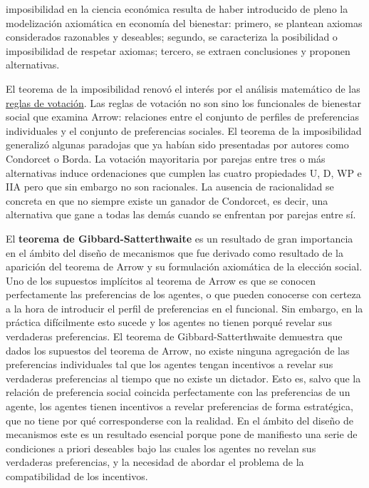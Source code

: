 \documentclass{nuevotema}
\begin{document}
imposibilidad en la ciencia económica resulta de haber introducido de pleno la modelización axiomática en economía del bienestar: primero, se plantean axiomas considerados razonables y deseables; segundo, se caracteriza la posibilidad o imposibilidad de respetar axiomas; tercero, se extraen conclusiones y proponen alternativas.

El teorema de la imposibilidad renovó el interés por el análisis matemático de las \underline{reglas de votación}. Las reglas de votación no son sino los funcionales de bienestar social que examina Arrow: relaciones entre el conjunto de perfiles de preferencias individuales y el conjunto de preferencias sociales. El teorema de la imposibilidad generalizó algunas paradojas que ya habían sido presentadas por autores como Condorcet o Borda. La votación mayoritaria por parejas entre tres o más alternativas induce ordenaciones que cumplen las cuatro propiedades U, D, WP e IIA pero que sin embargo no son racionales. La ausencia de racionalidad se concreta en que no siempre existe un ganador de Condorcet, es decir, una alternativa que gane a todas las demás cuando se enfrentan por parejas entre sí.

El \textbf{teorema de Gibbard-Satterthwaite} es un resultado de gran importancia en el ámbito del diseño de mecanismos que fue derivado como resultado de la aparición del teorema de Arrow y su formulación axiomática de la elección social. Uno de los supuestos implícitos al teorema de Arrow es que se conocen perfectamente las preferencias de los agentes, o que pueden conocerse con certeza a la hora de introducir el perfil de preferencias en el funcional. Sin embargo, en la práctica difícilmente esto sucede y los agentes no tienen porqué revelar sus verdaderas preferencias. El teorema de Gibbard-Satterthwaite demuestra que dados los supuestos del teorema de Arrow, no existe ninguna agregación de las preferencias individuales tal que los agentes tengan incentivos a revelar sus verdaderas preferencias al tiempo que no existe un dictador. Esto es, salvo que la relación de preferencia social coincida perfectamente con las preferencias de un agente, los agentes tienen incentivos a revelar preferencias de forma estratégica, que no tiene por qué corresponderse con la realidad. En el ámbito del diseño de mecanismos este es un resultado esencial porque pone de manifiesto una serie de condiciones a priori deseables bajo las cuales los agentes no revelan sus verdaderas preferencias, y la necesidad de abordar el problema de la compatibilidad de los incentivos.
\end{document}
